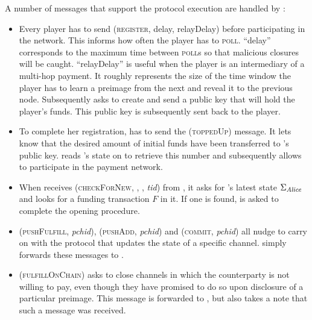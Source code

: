   A number of messages that support the protocol execution are handled by
  \fpaynet:
  \begin{itemize}
    \item Every player has to send (\textsc{register}, delay, relayDelay) before
    participating in the network. This informs \fpaynet{} how often the player
    has to \textsc{poll}. ``delay'' corresponds to the maximum time between
    \textsc{poll}s so that malicious closures will be caught. ``relayDelay'' is
    useful when the player is an intermediary of a multi-hop payment. It roughly
    represents the size of the time window the player has to learn a preimage
    from the next and reveal it to the previous node. Subsequently \fpaynet{}
    asks \simulator{} to create and send a public key that will hold the
    player's funds. This public key is subsequently sent back to the player.
    \item To complete her registration, \alice has to send the
    (\textsc{toppedUp}) message. It lets \fpaynet{} know that the desired amount
    of initial funds have been transferred to \alice's public key. \fpaynet{}
    reads \alice's state on \ledger{} to retrieve this number and subsequently
    allows \alice{} to participate in the payment network.
    \item When \fpaynet{} receives (\textsc{checkForNew}, \alice, \bob,
    \textit{tid}) from \alice, it asks \ledger{} for \alice's latest state
    $\Sigma_{\mathit{Alice}}$ and looks for a funding transaction $F$ in it. If one is
    found, \simulator{} is asked to complete the opening procedure.
    \item (\textsc{pushFulfill}, \textit{pchid}),
    (\textsc{pushAdd}, \textit{pchid}) and (\textsc{commit}, \textit{pchid})
    all nudge \simulator{} to carry on with the protocol that updates the state
    of a specific channel. \fpaynet{} simply forwards these messages to
    \simulator.
    \item (\textsc{fulfillOnChain}) asks \simulator{} to close channels in which
    the counterparty is not willing to pay, even though they have promised to do
    so upon disclosure of a particular preimage. This message is forwarded to
    \simulator{}, but also \fpaynet{} takes a note that such a message was
    received.
  \end{itemize}

